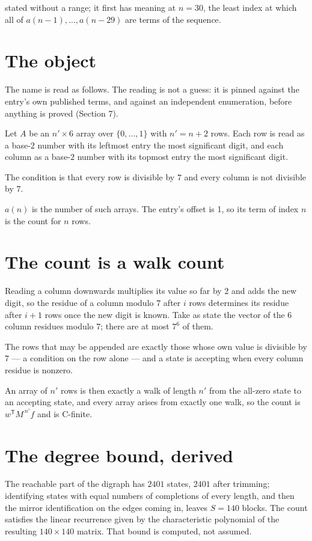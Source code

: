 \documentclass[11pt]{article}
\theoremstyle{definition}
\begin{document}
stated without a range; it first has meaning at $n = 30$, the least index at which all of $a(n-1),\dots,a(n-29)$ are terms of the sequence.

\section{The object}

The name is read as follows. The reading is not a guess: it is pinned against the entry's own published terms, and against an independent enumeration, before anything is proved (Section 7).

Let $A$ be an $n' \times 6$ array over $\{0,\dots,1\}$ with $n' = n + 2$ rows. Each row is read as a base-$2$ number with its leftmost entry the most significant digit, and each column as a base-$2$ number with its topmost entry the most significant digit.

The condition is that every row is divisible by $7$ and every column is not divisible by $7$.

$a(n)$ is the number of such arrays. The entry's offset is 1, so its term of index $n$ is the count for $n$ rows.

\section{The count is a walk count}

Reading a column downwards multiplies its value so far by $2$ and adds the new digit, so the residue of a column modulo $7$ after $i$ rows determines its residue after $i+1$ rows once the new digit is known. Take as state the vector of the $6$ column residues modulo $7$; there are at most $7^{6}$ of them.

The rows that may be appended are exactly those whose own value is divisible by $7$ --- a condition on the row alone --- and a state is accepting when every column residue is nonzero.

An array of $n'$ rows is then exactly a walk of length $n'$ from the all-zero state to an accepting state, and every array arises from exactly one walk, so the count is $w^{\mathsf T}M^{\,n'}f$ and is C-finite.

\section{The degree bound, derived}

The reachable part of the digraph has $2401$ states, $2401$ after trimming; identifying states with equal numbers of completions of every length, and then the mirror identification on the edges coming in, leaves $S = 140$ blocks. The count satisfies the linear recurrence given by the characteristic polynomial of the resulting $140\times140$ matrix. That bound is computed, not assumed.
\end{document}
